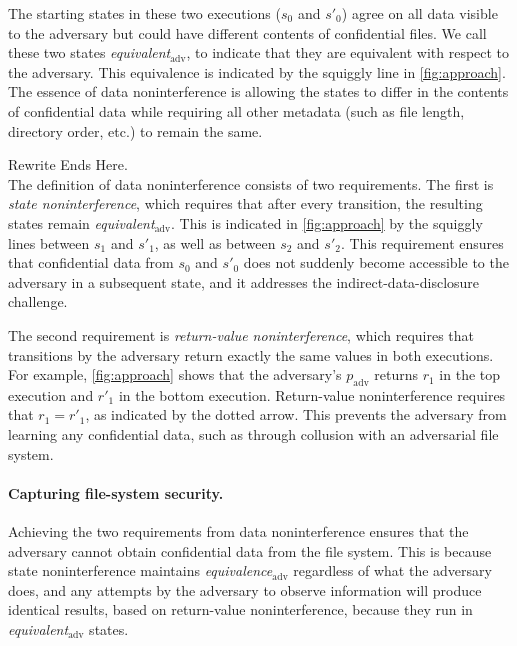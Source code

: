 The starting states in these two executions ($s_0$ and $s'_0$)
agree on all data visible to the adversary but could have
different contents of confidential files.  We call these two states
\emph{equivalent}$_\mathrm{adv}$, to indicate that they are equivalent
with respect to the adversary.  This equivalence is indicated by the
squiggly line in \autoref{fig:approach}.  The essence of data noninterference
is allowing the states to differ in the contents of confidential data
while requiring all other metadata (such as file length, directory order,
etc.) to remain the same.

{\color{red} Rewrite Ends Here. }\\

The definition of data noninterference consists of two
requirements.  The first is \emph{state noninterference},
which requires that after every transition, the resulting states
remain \emph{equivalent}$_\mathrm{adv}$.  This is indicated in
\autoref{fig:approach} by the squiggly lines between $s_1$ and $s'_1$,
as well as between $s_2$ and $s'_2$.  This requirement ensures that
confidential data from $s_0$ and $s'_0$ does not suddenly become
accessible to the adversary in a subsequent state, and it addresses the
indirect-data-disclosure challenge.

The second requirement is \emph{return-value noninterference},
which requires that transitions by the adversary return exactly the
same values in both executions.  For example, \autoref{fig:approach}
shows that the adversary's $p_\mathrm{adv}$ returns $r_1$ in the top
execution and $r'_1$ in the bottom execution.  Return-value noninterference
requires that $r_1=r'_1$, as indicated by the dotted
arrow.  This prevents the adversary
from learning any confidential data, such as through collusion with an
adversarial file system.


\paragraph{Capturing file-system security.}

Achieving the two requirements from data noninterference ensures
that the adversary cannot obtain confidential data from the
file system.  This is because state noninterference maintains
\emph{equivalence}$_\mathrm{adv}$ regardless of what the adversary does, and any attempts by the adversary to observe
information will produce identical results, based on return-value
noninterference,
because they run in \emph{equivalent}$_\mathrm{adv}$ states.

